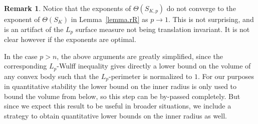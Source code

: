 \documentclass[a4paper, 10pt, twoside]{amsart}
\numberwithin{equation}{section}
\newcommand{\remkname}{Remark}
\theoremstyle{plain}
\theoremstyle{definition}
\newtheorem{remark}[theorem]{\remkname}
\begin{document}
\begin{remark}
    Notice that the exponents of $\Theta(S_{K,p})$ do not converge to the exponent of $\Theta(S_K)$ in Lemma~\ref{lemma.rR} as $p \to 1$. This is not surprising, and is an artifact of the $L_p$ surface measure not being translation invariant. It is not clear however if the exponents are optimal.
\end{remark}

In the case $p > n$, the above arguments are greatly simplified, since the corresponding $L_p$-Wulff inequality gives directly a lower bound on the volume of any convex body such that the $L_p$-perimeter is normalized to $1$. For our purposes in quantitative stability the lower bound on the inner radius is only used to bound the volume from below, so this step can be by-passed completely. But since we expect this result to be useful in broader situations, we include a strategy to obtain quantitative lower bounds on the inner radius as well.  
\end{document}
